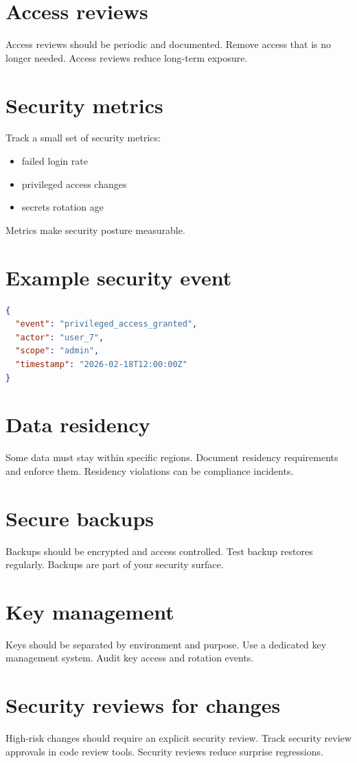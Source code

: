 \section{Access reviews}
Access reviews should be periodic and documented.
Remove access that is no longer needed.
Access reviews reduce long-term exposure.

\section{Security metrics}
Track a small set of security metrics:
\begin{itemize}[nosep]
  \item failed login rate
  \item privileged access changes
  \item secrets rotation age
\end{itemize}
Metrics make security posture measurable.

\section{Example security event}
\begin{lstlisting}[language=JSON]
{
  "event": "privileged_access_granted",
  "actor": "user_7",
  "scope": "admin",
  "timestamp": "2026-02-18T12:00:00Z"
}
\end{lstlisting}

\section{Data residency}
Some data must stay within specific regions.
Document residency requirements and enforce them.
Residency violations can be compliance incidents.

\section{Secure backups}
Backups should be encrypted and access controlled.
Test backup restores regularly.
Backups are part of your security surface.

\section{Key management}
Keys should be separated by environment and purpose.
Use a dedicated key management system.
Audit key access and rotation events.

\section{Security reviews for changes}
High-risk changes should require an explicit security review.
Track security review approvals in code review tools.
Security reviews reduce surprise regressions.

